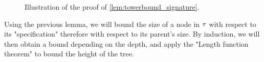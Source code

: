 
\begin{figure}[t]

	\centering
	
	\caption{Illustration of the proof of \cref{lem:towerbound_signature}. 
	}
	\label{fig:proof-pumping-signed}
\end{figure}

Using the previous lemma, we will bound the size of a node in $\tau$ with respect to its "specification" therefore with respect to its parent's size. By induction, we will then obtain a bound depending on the depth, and apply the "Length function theorem" to bound the height of the tree. 


